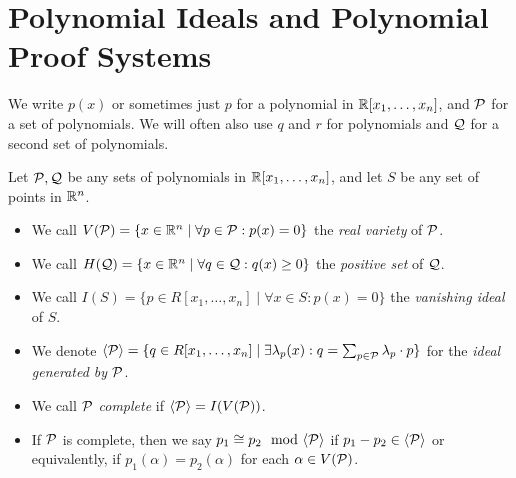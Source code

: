 \section{Polynomial Ideals and Polynomial Proof Systems}\label{sec:polyproofs}
We write $p(x)$ or sometimes just $p$ for a polynomial in $\mathbb R[x_1,\dots,x_n]$, and $\mathcal P$ for a set of polynomials.
We will often also use $q$ and $r$ for polynomials and $\mathcal Q$ for a second set of polynomials.
\begin{definition}
Let $\mathcal P,\mathcal Q$ be any sets of polynomials in $\mathbb R[x_1,\dots,x_n]$, and let $S$ be any set of points in $\mathbb R^n$.
\begin{itemize}
\item We call $V(\mathcal P) = \{x \in \mathbb R^n \mid \forall p \in \mathcal P: p(x) = 0\}$ the \emph{real variety} of $\mathcal P$.
\item We call $H(\mathcal Q) = \{x \in \mathbb R^n \mid \forall q \in \mathcal Q: q(x) \geq 0\}$ the \emph{positive set} of $\mathcal Q$.
\item We call $I(S) = \{p \in R[x_1,\dots,x_n] \mid \forall x \in S: p(x) = 0\}$ the \emph{vanishing ideal} of $S$.
\item We denote $\langle \mathcal P \rangle = \{q \in R[x_1,\dots,x_n] \mid \exists \lambda_p(x): q = \sum_{p \in \mathcal P} \lambda_p \cdot p\}$ for the \emph{ideal generated by $\mathcal P$}.
\item We call $\mathcal P$ \emph{complete} if $\langle \mathcal P \rangle = I(V(\mathcal P))$.
\item If $\mathcal P$ is complete, then we say $p_1 \cong p_2 \mod \gen{\cP}$ if $p_1 - p_2 \in \langle \mathcal P \rangle$ or equivalently, if $p_1(\alpha) = p_2(\alpha)$ for each $\alpha \in V(\mathcal P)$.
\end{itemize}
\end{definition}

